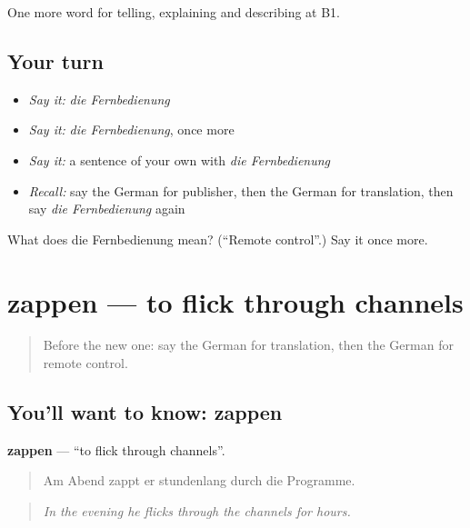 \begin{grammarlens}[title={What you've built}]
One more word for telling, explaining and describing at B1.
\end{grammarlens}

\subsection*{Your turn}
\begin{itemize}
\raggedright
  \item \emph{Say it:} \emph{die Fernbedienung}
  \item \emph{Say it:} \emph{die Fernbedienung}, once more
  \item \emph{Say it:} a sentence of your own with \emph{die Fernbedienung}
  \item \emph{Recall:} say the German for publisher, then the German for translation, then say \emph{die Fernbedienung} again
\end{itemize}

\begin{tcolorbox}[breakable,colback=teal!4,colframe=teal!35!black,title={Before you move on}]
What does die Fernbedienung mean? (\textquotedblleft{}Remote control\textquotedblright{}.) Say it once more.
\end{tcolorbox}
\section[zappen]{zappen — to flick through channels}

\label{lesson:GE-C523-zappen}



\begin{quote}
Before the new one: say the German for translation, then the German for remote control.
\end{quote}

\subsection*{You'll want to know: zappen}
\textbf{zappen} — \textquotedblleft{}to flick through channels\textquotedblright{}.

\begin{quote}
Am Abend zappt er stundenlang durch die Programme.
\end{quote}

\begin{quote}
\emph{In the evening he flicks through the channels for hours.}
\end{quote}

